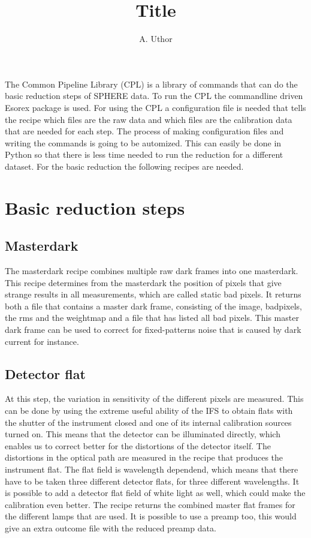 \documentclass[twoside,single]{lion-msc}
\title{Title}
\author{A. Uthor}
\begin{document}
\maketitle


The Common Pipeline Library (CPL) is a library of commands that can do the basic reduction steps of SPHERE data. To run the CPL the commandline driven Esorex package is used. For using the CPL a configuration file is needed that tells the recipe which files are the raw data and which files are the calibration data that are needed for each step. The process of making configuration files and writing the commands is going to be automized. This can easily be done in Python so that there is less time needed to run the reduction for a different dataset. For the basic reduction the following recipes are needed.

\section{Basic reduction steps}
\subsection{Masterdark}
The masterdark recipe combines multiple raw dark frames into one masterdark. This recipe determines from the masterdark the position of pixels that give strange results in all measurements, which are called static bad pixels. It returns both a file that contains a master dark frame, consisting of the image, badpixels, the rms and the weightmap and a file that has listed all bad pixels. This master dark frame can be used to correct for fixed-patterns noise that is caused by dark current for instance.

\subsection{Detector flat}
At this step, the variation in sensitivity of the different pixels are measured. This can be done by using the extreme useful ability of the IFS to obtain flats with the shutter of the instrument closed and one of its internal calibration sources turned on. This means that the detector can be illuminated directly, which enables us to correct better for the distortions of the detector itself. The distortions in the optical path are measured in the recipe that produces the instrument flat. The flat field is wavelength dependend, which means that there have to be taken three different detector flats, for three different wavelengths. It is possible to add a detector flat field of white light as well, which could make the calibration even better. The recipe returns the combined master flat frames for the different lamps that are used. It is possible to use a preamp too, this would give an extra outcome file with the reduced preamp data.
\end{document}
